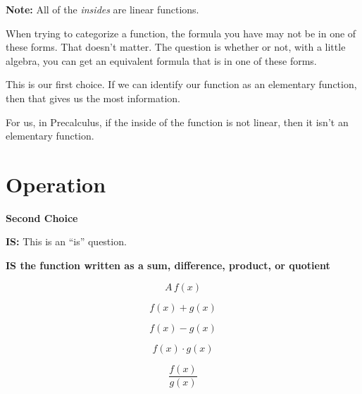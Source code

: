 \documentclass{ximera}
\begin{document}
\textbf{Note:} All of the \textit{insides} are linear functions. 


When trying to categorize a function, the formula you have may not be in one of these forms.  That doesn't matter.  The question is whether or not, with a little algebra, you can get an equivalent formula that is in one of these forms. 


This is our first choice.  If we can identify our function as an elementary function, then that gives us the most information. 


For us, in Precalculus, if the inside of the function is not linear, then it isn't an elementary function. 






































\section*{Operation}

\textbf{\textcolor{purple!85!blue}{Second Choice}} 


\textbf{\textcolor{purple!70!blue}{IS:}}   This is an ``is'' question. 

\begin{center}
\textbf{\textcolor{red!80!black}{IS the function written as a sum, difference, product, or quotient}}

\end{center}




\[
A \, f(x) 
\]


\[
f(x) + g(x)
\]


\[
f(x) - g(x)
\]


\[
f(x) \cdot g(x)
\]


\[
\frac{f(x)}{g(x)}
\]
\end{document}
